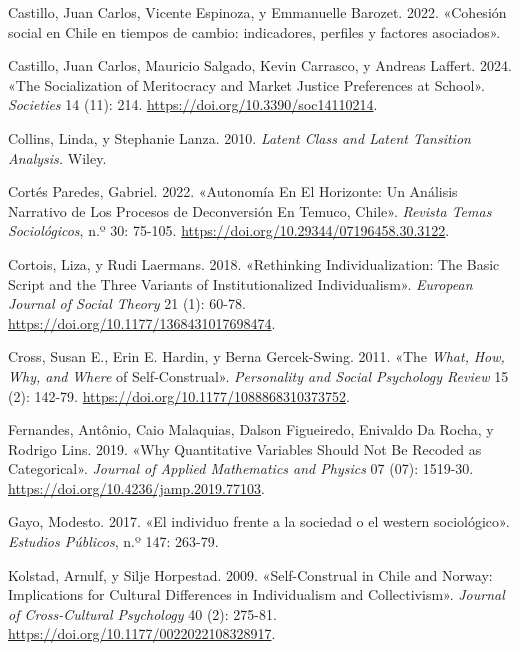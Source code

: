 \documentclass[
  letterpaper,
  DIV=11,
  numbers=noendperiod]{scrartcl}
\newlength{\cslhangindent}
\newenvironment{CSLReferences}[2] %
 {\begin{list}{}{%
  \setlength{\itemindent}{0pt}
  \setlength{\leftmargin}{0pt}
  \setlength{\parsep}{0pt}
  \ifodd #1
   \setlength{\leftmargin}{\cslhangindent}
   \setlength{\itemindent}{-1\cslhangindent}
  \fi
  \setlength{\itemsep}{#2\baselineskip}}}
 {\end{list}}
\begin{document}
\begin{CSLReferences}{1}{0}
Castillo, Juan Carlos, Vicente Espinoza, y Emmanuelle Barozet. 2022.
{«{Cohesi{ó}n social en Chile en tiempos de cambio: indicadores,
perfiles y factores asociados}»}.

Castillo, Juan Carlos, Mauricio Salgado, Kevin Carrasco, y Andreas
Laffert. 2024. {«The {Socialization} of {Meritocracy} and {Market
Justice Preferences} at {School}»}. \emph{Societies} 14 (11): 214.
\url{https://doi.org/10.3390/soc14110214}.

Collins, Linda, y Stephanie Lanza. 2010. \emph{Latent Class and Latent
Tansition Analysis.} Wiley.

Cortés Paredes, Gabriel. 2022. {«Autonom{í}a En El Horizonte: Un
An{á}lisis Narrativo de Los Procesos de Deconversi{ó}n En {Temuco},
{Chile}»}. \emph{Revista Temas Sociol{ó}gicos}, n.º 30: 75-105.
\url{https://doi.org/10.29344/07196458.30.3122}.

Cortois, Liza, y Rudi Laermans. 2018. {«Rethinking Individualization:
{The} Basic Script and the Three Variants of Institutionalized
Individualism»}. \emph{European Journal of Social Theory} 21 (1): 60-78.
\url{https://doi.org/10.1177/1368431017698474}.

Cross, Susan E., Erin E. Hardin, y Berna Gercek-Swing. 2011. {«The
{\emph{What}}{\emph{,} }{\emph{How}}{\emph{,} }{\emph{Why}}{\emph{, and}
}{\emph{Where}} of {Self-Construal}»}. \emph{Personality and Social
Psychology Review} 15 (2): 142-79.
\url{https://doi.org/10.1177/1088868310373752}.

Fernandes, Antônio, Caio Malaquias, Dalson Figueiredo, Enivaldo Da
Rocha, y Rodrigo Lins. 2019. {«Why {Quantitative Variables Should Not Be
Recoded} as {Categorical}»}. \emph{Journal of Applied Mathematics and
Physics} 07 (07): 1519-30.
\url{https://doi.org/10.4236/jamp.2019.77103}.

Gayo, Modesto. 2017. {«{El individuo frente a la sociedad o el western
sociol{ó}gico}»}. \emph{Estudios P{ú}blicos}, n.º 147: 263-79.

Kolstad, Arnulf, y Silje Horpestad. 2009. {«Self-{Construal} in {Chile}
and {Norway}: {Implications} for {Cultural Differences} in
{Individualism} and {Collectivism}»}. \emph{Journal of Cross-Cultural
Psychology} 40 (2): 275-81.
\url{https://doi.org/10.1177/0022022108328917}.


\end{CSLReferences}
\end{document}
